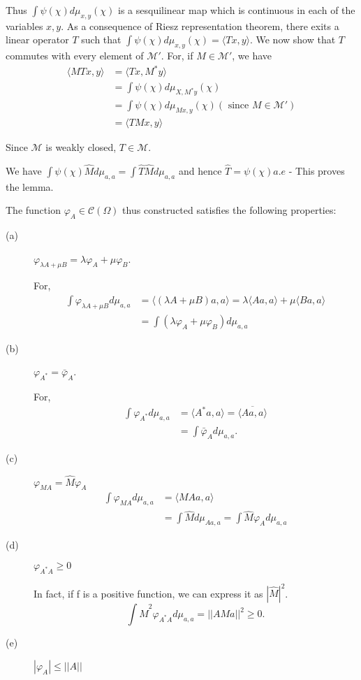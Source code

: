 Thus $\int \psi{(\chi)} d \mu_{x,y}(\chi)$  is a sesquilinear map
which is continuous in each of the variables $x,y$. As a consequence
of Riesz representation theorem, there exits a linear operator $T$
such that $\int \psi{(\chi)} d \mu_{x,y}(\chi)  = \langle Tx,y
\rangle$. We now show that $T$ commutes with every element of
$\mathscr{M}'$. For, if $M \in \mathscr{M}'$, we have 
\begin{align*}
\langle M T x,y \rangle &= \langle Tx, M^*y \rangle \\  
&=
\int \psi{(\chi)} d \mu_{X,M^*y}(\chi)\\ 
&=
\int \psi{(\chi)} d \mu_{Mx ,y}(\chi) (\text { since } M \in
\mathscr{M}') \\ 
&=
\langle TMx,y\rangle 
\end{align*}

Since $\mathscr{M}$ is weakly closed, $T \in \mathscr{M}$.

We have $\int \psi (\chi) \hat{M}d \mu_{a,a} = \int \hat{T}\hat{M}d
\mu _{a,a}$  and hence  $\hat{T} = \psi (\chi) a.e$ - This proves the
lemma. 

The function $\varphi_A \in \mathscr{C}(\Omega)$ thus constructed
satisfies the following properties:
\begin{description}
\item[(a)] $\varphi_{\lambda A+ \mu B}  = \lambda \varphi_A +
  \mu \varphi_B$.
 
 For, 
\begin{align*}
\int \varphi_{\lambda {A} + \mu B} d \mu_{a,a} &=
  \langle(\lambda A + \mu B) a,a \rangle = \lambda \langle Aa, a
  \rangle + \mu \langle Ba, a \rangle\\
&= \int (\lambda \varphi_A + \mu \varphi_B) d \mu_{a,a}
\end{align*}

\item[(b)] $\varphi_{A^*} = \bar{\varphi}_A$.

 For, 
\begin{align*}
\int \varphi_{A^*} d \mu_{a,a} &= \langle A^*a,a \rangle =
 \overline {\langle Aa,a \rangle}\\ 
&= \int \bar{\varphi}_A d \mu_{a,a}.
\end{align*}

\item[(c)] $\varphi_{MA} = \hat{M} \varphi_A$\pageoriginale
\begin{align*}
 \int \varphi_{MA} d \mu_{a,a} &= \langle MAa,a \rangle\\
& = \int \hat{M}d \mu_{Aa,a} = \int \hat{M} \varphi_A d \mu_{a,a} 
\end{align*}

\item[(d)] $\varphi_{A^*A} \ge 0$ 

In fact, if f is a positive function, we can express it as 
$ | \hat{M} |^2$. 
 $$
 \int \hat{M}^2 \varphi_{A^*A} d \mu_{a,a} = || AMa ||^2  \ge 0. 
 $$

\item[(e)]  $| \varphi_A | \le || A || $
\end{description} 

